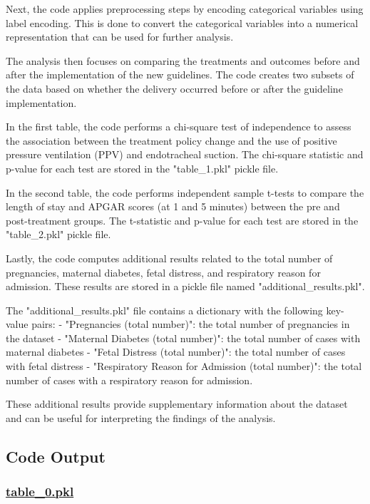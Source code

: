 \documentclass[11pt]{article}
\begin{document}
Next, the code applies preprocessing steps by encoding categorical variables using label encoding. This is done to convert the categorical variables into a numerical representation that can be used for further analysis.

The analysis then focuses on comparing the treatments and outcomes before and after the implementation of the new guidelines. The code creates two subsets of the data based on whether the delivery occurred before or after the guideline implementation.

In the first table, the code performs a chi-square test of independence to assess the association between the treatment policy change and the use of positive pressure ventilation (PPV) and endotracheal suction. The chi-square statistic and p-value for each test are stored in the "table\_1.pkl" pickle file.

In the second table, the code performs independent sample t-tests to compare the length of stay and APGAR scores (at 1 and 5 minutes) between the pre and post-treatment groups. The t-statistic and p-value for each test are stored in the "table\_2.pkl" pickle file.

Lastly, the code computes additional results related to the total number of pregnancies, maternal diabetes, fetal distress, and respiratory reason for admission. These results are stored in a pickle file named "additional\_results.pkl".

The "additional\_results.pkl" file contains a dictionary with the following key-value pairs:
- "Pregnancies (total number)": the total number of pregnancies in the dataset
- "Maternal Diabetes (total number)": the total number of cases with maternal diabetes
- "Fetal Distress (total number)": the total number of cases with fetal distress
- "Respiratory Reason for Admission (total number)": the total number of cases with a respiratory reason for admission.

These additional results provide supplementary information about the dataset and can be useful for interpreting the findings of the analysis.

\subsection{Code Output}\hypertarget{file-table-0-pkl}{}

\subsubsection*{\hyperlink{code-Data Analysis-table-0-pkl}{table\_0.pkl}}
\end{document}
